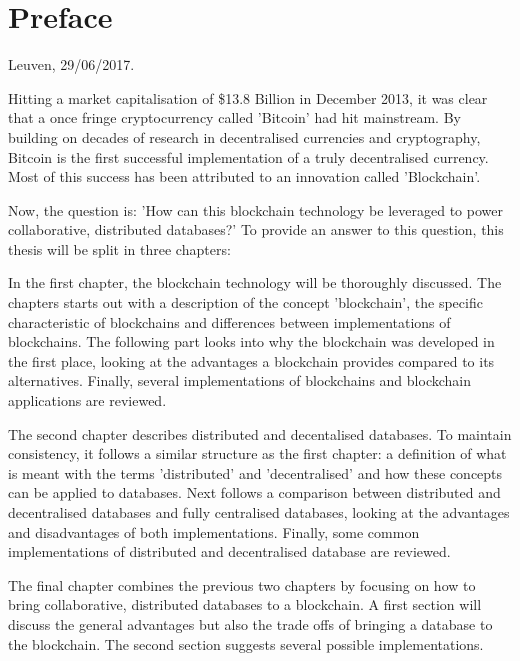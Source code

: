 \chapter*{Preface\hfill} 

\begin{flushright}
Leuven, 29/06/2017.
\end{flushright}



Hitting a market capitalisation of \$13.8 Billion in December 2013, it was clear that a once fringe cryptocurrency called 'Bitcoin' had hit mainstream. By building on decades of research in decentralised currencies and cryptography, Bitcoin is the first successful implementation of a truly decentralised currency. Most of this success has been attributed to an innovation called 'Blockchain'.


Now, the question is: 'How can this blockchain technology be leveraged to power collaborative, distributed databases?' To provide an answer to this question, this thesis will be split in three chapters:


In the first chapter, the blockchain technology will be thoroughly discussed. The chapters starts out with a description of the concept 'blockchain', the specific characteristic of blockchains and differences between implementations of blockchains. The following part looks into why the blockchain was developed in the first place, looking at the advantages a blockchain provides compared to its alternatives. Finally, several implementations of blockchains and blockchain applications are reviewed.

The second chapter describes distributed and decentalised databases. To maintain consistency, it follows a similar structure as the first chapter: a definition of what is meant with the terms 'distributed' and 'decentralised' and how these concepts can be applied to databases. Next follows a comparison between distributed and decentralised databases and fully centralised databases, looking at the advantages and disadvantages of both implementations. Finally, some common implementations of distributed and decentralised database are reviewed.

The final chapter combines the previous two chapters by focusing on how to bring collaborative, distributed databases to a blockchain. A first section will discuss the general advantages but also the trade offs of bringing a database to the blockchain. The second section suggests several possible implementations.